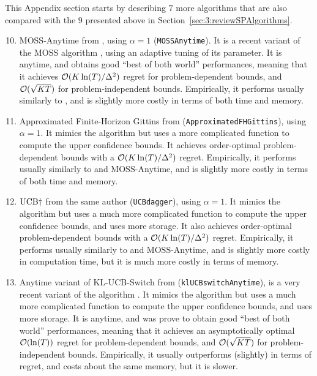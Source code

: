 This Appendix section starts by describing $7$ more algorithms that are also compared with the $9$ presented above in Section~\ref{sec:3:reviewSPAlgorithms}.

\begin{enumerate}
    \setcounter{enumi}{9}
    \item
    $\mathrm{MOSS}$-$\mathrm{Anytime}$ from \cite{Degenne16}, using $\alpha=1$ (\texttt{MOSSAnytime}).
    It is a recent variant of the $\mathrm{MOSS}$ algorithm \cite{BubeckSlivkins12}, using an adaptive tuning of its parameter. It is anytime, and obtains good ``best of both world'' performances, meaning that it achieves $\mathcal{O}(K\ln(T)/\Delta^2)$ regret for problem-dependent bounds, and $\mathcal{O}(\sqrt{KT})$ for problem-independent bounds.
    Empirically, it performs usually similarly to \UCB, and is slightly more costly in terms of both time and memory.

    \item
    Approximated Finite-Horizon Gittins from \cite{Lattimore16a} (\texttt{ApproximatedFHGittins}), using $\alpha=1$.
    It mimics the \UCB{} algorithm but uses a more complicated function to compute the upper confidence bounds.
    It achieves order-optimal problem-dependent bounds with a $\mathcal{O}(K\ln(T)/\Delta^2)$ regret.
    Empirically, it performs usually similarly to \UCB{} and $\mathrm{MOSS}$-$\mathrm{Anytime}$, and is slightly more costly in terms of both time and memory.

    \item
    $\mathrm{UCB}\dagger$ from the same author \cite{Lattimore2018refining} (\texttt{UCBdagger}), using $\alpha=1$.
    It mimics the \UCB{} algorithm but uses a much more complicated function to compute the upper confidence bounds, and uses more storage.
    It also achieves order-optimal problem-dependent bounds with a $\mathcal{O}(K\ln(T)/\Delta^2)$ regret.
    Empirically, it performs usually similarly to \UCB{} and $\mathrm{MOSS}$-$\mathrm{Anytime}$, and is slightly more costly in computation time, but it is much more costly in terms of memory.

    \item
    Anytime variant of KL-UCB-Switch from \cite{GarivierHadiji2018}
    (\texttt{klUCBswitchAnytime}),
    is a very recent variant of the \KLUCB{} algorithm \cite{KLUCBJournal}.
    It mimics the \KLUCB{} algorithm but uses a much more complicated function to compute the upper confidence bounds, and uses more storage.
    It is anytime, and was prove to obtain good ``best of both world'' performances, meaning that it achieves an asymptotically optimal $\mathcal{O}(\ln(T))$ regret for problem-dependent bounds, and $\mathcal{O}(\sqrt{KT})$ for problem-independent bounds.
    Empirically, it usually outperforms (slightly) \klUCB{} in terms of regret, and costs about the same memory, but it is slower.


\end{enumerate}
